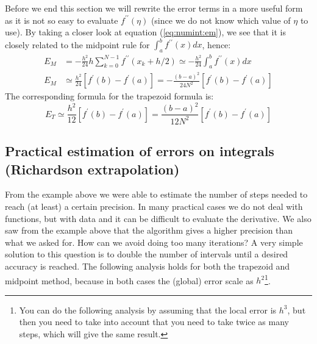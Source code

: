 \documentclass[graybox,sectrefs,envcountresetchap,open=right,final]{svmonodo}
\begin{document}
Before we end this section we will rewrite the error terms in a more useful form as it is not so easy to evaluate 
$f^{\prime\prime}(\eta)$ (since we do not know which value of $\eta$ to use). By taking a closer look at equation (\ref{eq:numint:em}), 
we see that it is closely related to the midpoint rule for $\int_a^bf^{\prime\prime}(x)dx$, hence:
\begin{align}
E_{M}&=-\frac{h^2}{24}h
\sum_{k=0}^{N-1}f^{\prime\prime}(x_k+h/2)\simeq-\frac{h^2}{24}\int_a^b
f^{\prime\prime}(x)dx\\ 
E_M&\simeq\frac{h^2}{24}\left[f^\prime(b)-f^\prime(a)\right]=-\frac{(b-a)^2}{24N^2}\left[f^\prime(b)-f^\prime(a)\right]
\end{align}
The corresponding formula for the trapezoid formula is:
\begin{equation}
E_T\simeq \frac{h^2}{12}\left[f^\prime(b)-f^\prime(a)\right]=\frac{(b-a)^2}{12N^2}\left[f^\prime(b)-f^\prime(a)\right]
\end{equation}
\subsection{Practical estimation of errors on integrals (Richardson extrapolation)}
\label{sec:numint:parct}
From the example above we were able to estimate the number of steps needed to reach (at least) a certain precision. 
In many practical cases we do not deal with functions, but with data and it can be difficult to evaluate the derivative. 
We also saw from the example above that the algorithm gives a higher precision than what we asked for. 
How can we avoid doing too many iterations? A very simple solution to this question is to double the number of intervals until 
a desired accuracy is reached. The following analysis holds for both the trapezoid and midpoint method, because in both cases 
the (global) error scale as $h^2$\footnote{You can do the following analysis by assuming that the local error is $h^3$, but then you need to take into account that you need to take twice as many steps, which will give the same result.}.
\end{document}
